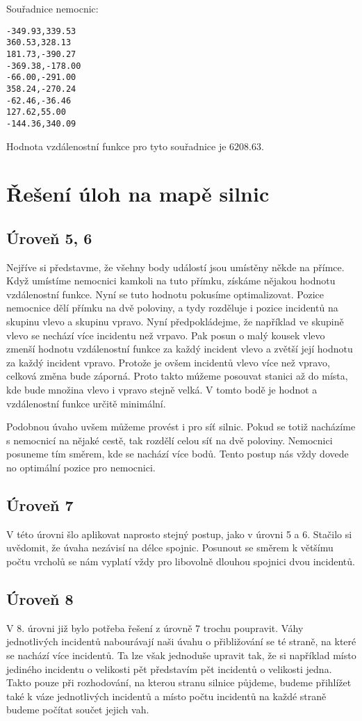 \documentclass[12pt,a4paper]{article}
\begin{document}
Souřadnice nemocnic:
\begin{verbatim}
-349.93,339.53
360.53,328.13
181.73,-390.27
-369.38,-178.00
-66.00,-291.00
358.24,-270.24
-62.46,-36.46
127.62,55.00
-144.36,340.09
\end{verbatim}

Hodnota vzdálenostní funkce pro tyto souřadnice je $6208.63$.

\section*{Řešení úloh na mapě silnic}
\subsection*{Úroveň 5, 6}
Nejříve si představme, že všehny body událostí jsou umístěny někde na přímce. Když umístíme nemocnici kamkoli na tuto přímku, získáme nějakou hodnotu vzdálenostní funkce.
Nyní se tuto hodnotu pokusíme optimalizovat. Pozice nemocnice dělí přímku na dvě poloviny, a tydy rozděluje i pozice incidentů na skupinu vlevo a skupinu vpravo.
Nyní předpokládejme, že například ve skupině vlevo se nechází více incidentu než vrpavo. Pak posun o malý kousek vlevo zmenší hodnotu vzdálenostní funkce za každý incident vlevo a zvětší její hodnotu za každý incident vpravo.
Protože je ovšem incidentů vlevo více než vpravo, celková změna bude záporná. Proto takto múžeme posouvat stanici až do místa, kde bude množina vlevo i vpravo stejně velká.
V tomto bodě je hodnot a vzdálenostní funkce určitě minimální.

Podobnou úvaho uvšem můžeme provést i pro síť silnic. Pokud se totiž nacházíme s nemocnicí na nějaké cestě, tak rozdělí celou síť na dvě poloviny. Nemocnici posuneme tím směrem, kde se nachází více bodů.
Tento postup nás vždy dovede no optimální pozice pro nemocnici.

\subsection*{Úroveň 7}
V této úrovni šlo aplikovat naprosto stejný postup, jako v úrovni 5 a 6. Stačilo si uvědomit, že úvaha nezávisí na délce spojnic. Posunout se směrem k většímu počtu vrcholů se nám vyplatí vždy pro libovolně dlouhou spojnici dvou incidentů.

\subsection*{Úroveň 8}
V 8. úrovni již bylo potřeba řešení z úrovně 7 trochu poupravit. Váhy jednotlivých incidentů nabourávají naši úvahu o přibližování se té straně, na které se nachází více incidentů.
Ta lze však jednoduše upravit tak, že si například místo jediného incidentu o velikosti pět představím pět incidentů o velikosti jedna. Takto pouze při rozhodování, na kterou stranu silnice půjdeme, budeme přihlížet také k váze jednotlivých incidentů a místo počtu incidentů na každé straně budeme počítat součet jejich vah.
\end{document}
